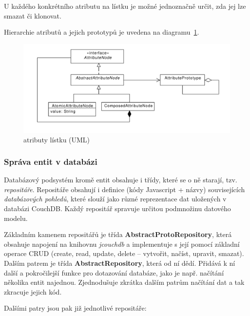 U každého konkrétního atributu na lístku je možné jednoznačně určit, zda jej lze smazat či klonovat.

Hierarchie atributů a jejich prototypů je uvedena na diagramu~\ref{fig:uml_attribute}.

\begin{figure}
\centering
\includegraphics[width=\textwidth]{uml_attribute.pdf}
\caption{atributy lístku (UML)}
\label{fig:uml_attribute}
\end{figure}

\subsubsection{Správa entit v databázi}

Databázový podsystém kromě entit obsahuje i třídy, které se o ně starají, tzv. {\em repositáře}. Repositáře obsahují i definice (kódy Javascript + názvy) souvisejících {\em databázových pohledů}, které slouží jako různé reprezentace dat uložených v databázi CouchDB. Každý repositář spravuje určitou podmnožinu datového modelu.

Základním kamenem repositářů je třída {\bf AbstractProtoRepository}, která obsahuje napojení na knihovnu {\em jcouchdb} a implementuje s její pomocí základní operace CRUD (create, read, update, delete -- vytvořit, načíst, upravit, smazat). Dalším patrem je třída {\bf AbstractRepository}, která od ní dědí. Přidává k ní další a pokročilejší funkce pro dotazování databáze, jako je např. načítání několika entit najednou. Zjednodušuje zkrátka dalším patrům načítání dat a tak zkracuje jejich kód.

Dalšími patry jsou pak již jednotlivé repositáře:

